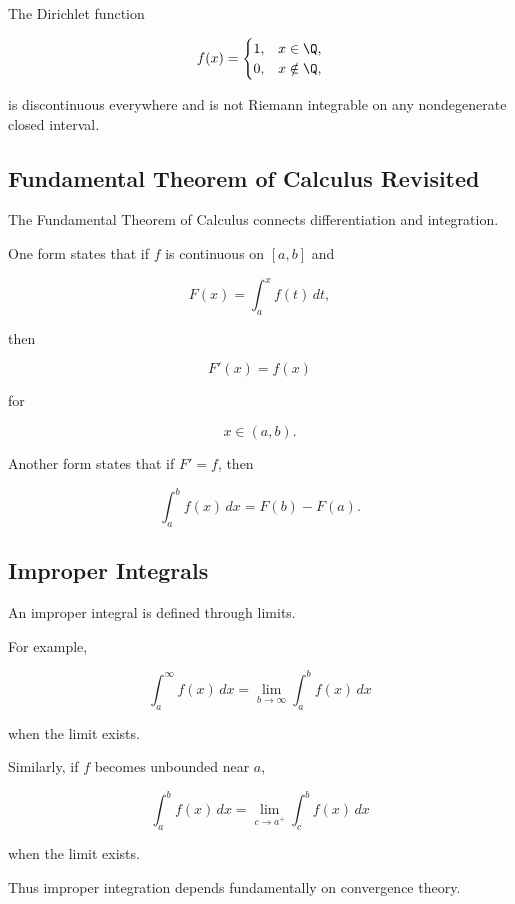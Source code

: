 The Dirichlet function

\[
f(x)
=
\begin{cases}
1, & x\in\Q,\\
0, & x\notin\Q,
\end{cases}
\]

is discontinuous everywhere and is not Riemann integrable on any
nondegenerate closed interval.

\subsection{Fundamental Theorem of Calculus Revisited}
\label{subsec:ftc-real-analysis}

The Fundamental Theorem of Calculus connects differentiation and
integration.

One form states that if \(f\) is continuous on \([a,b]\) and

\[
F(x)
=
\int_a^x f(t)\,dt,
\]

then

\[
\boxed{
F'(x)=f(x)
}
\]

for

\[
x\in(a,b).
\]

Another form states that if \(F'=f\), then

\[
\boxed{
\int_a^b f(x)\,dx
=
F(b)-F(a).
}
\]

\subsection{Improper Integrals}
\label{subsec:improper-integrals-analysis}

An improper integral is defined through limits.

For example,

\[
\boxed{
\int_a^\infty f(x)\,dx
=
\lim_{b\to\infty}
\int_a^b f(x)\,dx
}
\]

when the limit exists.

Similarly, if \(f\) becomes unbounded near \(a\),

\[
\boxed{
\int_a^b f(x)\,dx
=
\lim_{c\to a^+}
\int_c^b f(x)\,dx
}
\]

when the limit exists.

Thus improper integration depends fundamentally on convergence theory.

